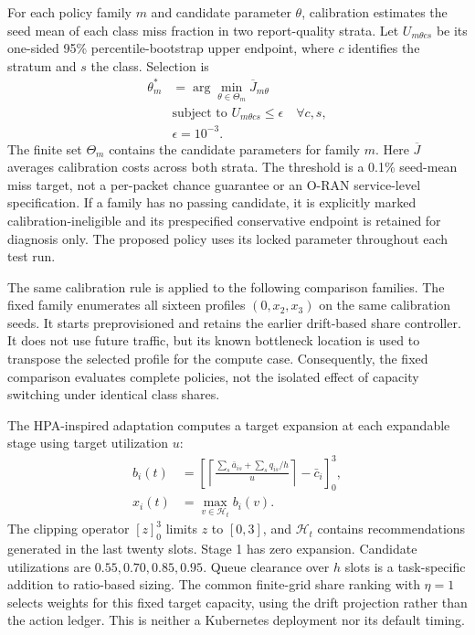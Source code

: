 \documentclass{IEEEoj}
\begin{document}
For each policy family $m$ and candidate parameter $\theta$, calibration
estimates the seed mean of each class miss fraction in two report-quality
strata. Let $U_{m\theta cs}$ be its one-sided 95\% percentile-bootstrap upper
endpoint, where $c$ identifies the stratum and $s$ the class. Selection is
\begin{equation}
\begin{aligned}
 \theta_m^*&=\arg\min_{\theta\in\Theta_m}\overline J_{m\theta}\\
 &\text{subject to }U_{m\theta cs}\le\epsilon\quad\forall c,s,\\
 &\epsilon=10^{-3}.
\end{aligned}
\label{eq:calibration}
\end{equation}
The finite set $\Theta_m$ contains the candidate parameters for family $m$. Here $\overline J$ averages calibration costs across both strata. The threshold
is a 0.1\% seed-mean miss target, not a per-packet chance guarantee or an
O-RAN service-level specification. If a family has no passing candidate, it
is explicitly marked calibration-ineligible and its prespecified conservative
endpoint is retained for diagnosis only. The proposed policy uses its locked parameter throughout each test run.


The same calibration rule is applied to the following comparison families.
The fixed family enumerates all sixteen profiles $(0,x_2,x_3)$ on the same
calibration seeds. It starts preprovisioned and retains the earlier drift-based
share controller. It does not use future traffic, but its known bottleneck
location is used to transpose the selected profile for the compute case.
Consequently, the fixed comparison evaluates complete policies, not the
isolated effect of capacity switching under identical class shares.

The HPA-inspired adaptation computes a target expansion at each expandable
stage using target utilization $u$:
\begin{equation}
\begin{aligned}
 b_i(t)&=\left[\left\lceil\frac{\sum_s\bar a_{is}+\sum_s q_{is}/h}{u}\right\rceil-\bar c_i\right]_0^3,\\
 x_i(t)&=\max_{v\in\mathcal H_t}b_i(v).
\end{aligned}
\label{eq:hpa}
\end{equation}
The clipping operator $[z]_0^3$ limits $z$ to $[0,3]$, and $\mathcal H_t$
contains recommendations generated in the last twenty slots. Stage 1 has
zero expansion. Candidate utilizations are $0.55,0.70,0.85,0.95$. Queue
clearance over $h$ slots is a task-specific addition to ratio-based sizing.
The common finite-grid share ranking with $\eta=1$ selects weights for this
fixed target capacity, using the drift projection rather than the action
ledger. This is neither a Kubernetes deployment nor its default timing.
\end{document}

